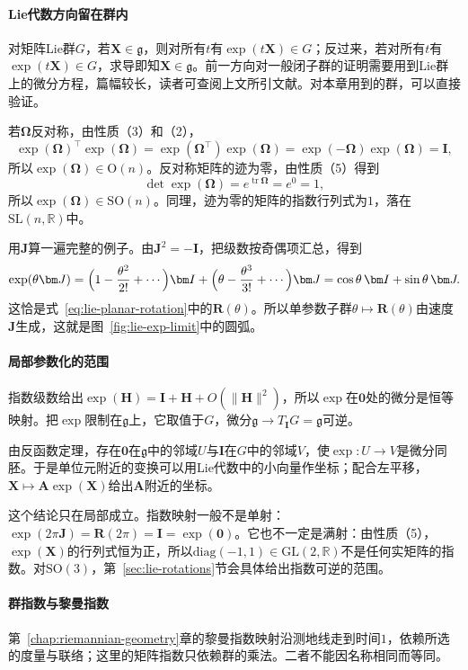 \paragraph{Lie代数方向留在群内}
对矩阵Lie群$G$，若$\bm X\in\mathfrak g$，则对所有$t$有$\exp(t\bm X)\in G$；反过来，若对所有$t$有$\exp(t\bm X)\in G$，求导即知$\bm X\in\mathfrak g$。前一方向对一般闭子群的证明需要用到Lie群上的微分方程，篇幅较长，读者可查阅上文所引文献。对本章用到的群，可以直接验证。

若$\bm\Omega$反对称，由性质（3）和（2），
\[
\exp(\bm\Omega)^\top\exp(\bm\Omega)
=\exp(\bm\Omega^\top)\exp(\bm\Omega)
=\exp(-\bm\Omega)\exp(\bm\Omega)=\bm I,
\]
所以$\exp(\bm\Omega)\in\mathrm O(n)$。反对称矩阵的迹为零，由性质（5）得到
\[
\det\exp(\bm\Omega)=e^{\operatorname{tr}\bm\Omega}=e^0=1,
\]
所以$\exp(\bm\Omega)\in\mathrm{SO}(n)$。同理，迹为零的矩阵的指数行列式为$1$，落在$\mathrm{SL}(n,\mathbb R)$中。

用$\bm J$算一遍完整的例子。由$\bm J^2=-\bm I$，把级数按奇偶项汇总，得到
\[
\exp(\theta\bm J)
=\Bigl(1-\frac{\theta^2}{2!}+\cdots\Bigr)\bm I
+\Bigl(\theta-\frac{\theta^3}{3!}+\cdots\Bigr)\bm J
=\cos\theta\,\bm I+\sin\theta\,\bm J .
\]
这恰是式~\eqref{eq:lie-planar-rotation}中的$\bm R(\theta)$。所以单参数子群$\theta\mapsto\bm R(\theta)$由速度$\bm J$生成，这就是图~\ref{fig:lie-exp-limit}中的圆弧。

\paragraph{局部参数化的范围}
指数级数给出$\exp(\bm H)=\bm I+\bm H+O(\lVert\bm H\rVert^2)$，所以$\exp$在$\bm0$处的微分是恒等映射。把$\exp$限制在$\mathfrak g$上，它取值于$G$，微分$\mathfrak g\to T_{\bm I}G=\mathfrak g$可逆。

由反函数定理，存在$\bm0$在$\mathfrak g$中的邻域$U$与$\bm I$在$G$中的邻域$V$，使$\exp:U\to V$是微分同胚。于是单位元附近的变换可以用Lie代数中的小向量作坐标；配合左平移，$\bm X\mapsto\bm A\exp(\bm X)$给出$\bm A$附近的坐标。

这个结论只在局部成立。指数映射一般不是单射：$\exp(2\pi\bm J)=\bm R(2\pi)=\bm I=\exp(\bm0)$。它也不一定是满射：由性质（5），$\exp(\bm X)$的行列式恒为正，所以$\mathrm{diag}(-1,1)\in\mathrm{GL}(2,\mathbb R)$不是任何实矩阵的指数。对$\mathrm{SO}(3)$，第~\ref{sec:lie-rotations}节会具体给出指数可逆的范围。

\paragraph{群指数与黎曼指数}
第~\ref{chap:riemannian-geometry}章的黎曼指数映射沿测地线走到时间$1$，依赖所选的度量与联络；这里的矩阵指数只依赖群的乘法。二者不能因名称相同而等同。


